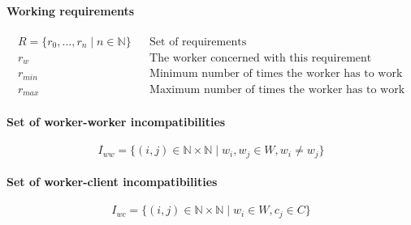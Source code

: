 \documentclass[../../thesis.tex]{subfiles}
\begin{document}
\paragraph{Working requirements}

\begin{align*}
    R = \{ r_0, \dots, r_n \mid n \in \mathbb{N} \} && \text{Set of requirements} \\ 
    r_{w}   && \text{The worker concerned with this requirement} \\
    r_{min} && \text{Minimum number of times the worker has to work} \\
    r_{max} && \text{Maximum number of times the worker has to work}
\end{align*}


\paragraph{Set of worker-worker incompatibilities}

\begin{equation*}
    {I_{ww} = \{ ({i},{j}) \in \mathbb{N} \times \mathbb{N} \mid w_i, w_j \in W, w_i \neq w_j \}}
\end{equation*}


\paragraph{Set of worker-client incompatibilities}
\begin{equation*}
    I_{wc} = \{ (i, j) \in \mathbb{N} \times \mathbb{N} \mid w_i \in W, c_j \in C \}
\end{equation*}



  
\end{document}
